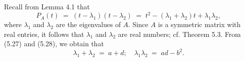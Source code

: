
Recall from Lemma 4.1 that
\begin{equation}
P_A(t) \;=\; (t-\lambda_1)(t-\lambda_2) \;=\; t^2 - (\lambda_1+\lambda_2)t + \lambda_1\lambda_2,
\end{equation}
where $\lambda_1$ and $\lambda_2$ are the eigenvalues of $A$. Since $A$ is a symmetric
matrix with real entries, it follows that $\lambda_1$ and $\lambda_2$ are real numbers;
cf. Theorem 5.3. From (5.27) and (5.28), we obtain that
\begin{equation}
\lambda_1+\lambda_2 \;=\; a+d; \quad \lambda_1\lambda_2 \;=\; ad-b^2.
\end{equation}

